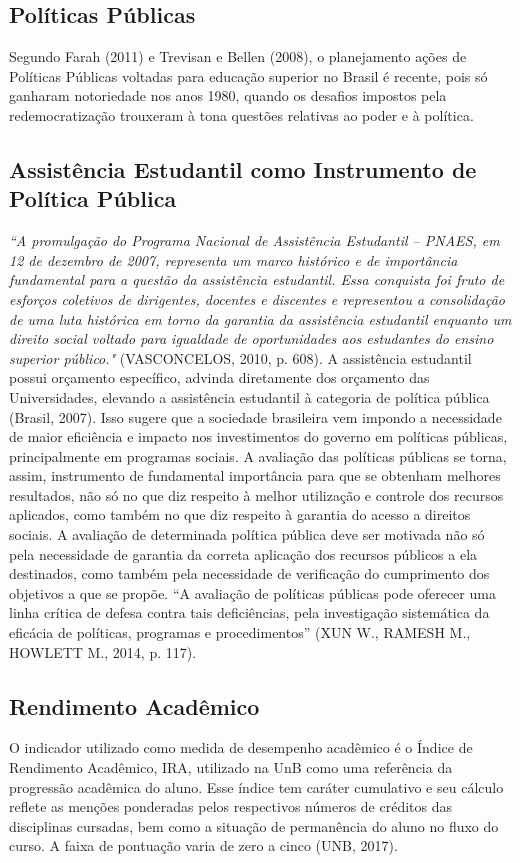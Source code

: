 \subsection{Políticas Públicas}
Segundo Farah (2011) e Trevisan e Bellen (2008), o planejamento ações de Políticas Públicas voltadas para educação superior no Brasil é recente, pois só ganharam notoriedade nos anos 1980, quando os desafios impostos pela redemocratização trouxeram à tona questões relativas ao poder e à política.
\subsection{Assistência Estudantil como Instrumento de Política Pública}
\emph{“A promulgação do Programa Nacional de Assistência Estudantil – PNAES, em 12 de dezembro de 2007, representa um marco histórico e de importância fundamental para a questão da assistência estudantil. Essa conquista foi fruto de esforços coletivos de dirigentes, docentes e discentes e representou a consolidação de uma luta histórica em torno da garantia da assistência estudantil enquanto um direito social voltado para igualdade de oportunidades aos estudantes do ensino superior público."} (VASCONCELOS, 2010, p. 608).
A assistência estudantil possui orçamento específico, advinda diretamente dos orçamento das Universidades, elevando a assistência estudantil à categoria de política pública (Brasil, 2007). Isso sugere que a sociedade brasileira vem impondo a necessidade de maior eficiência e impacto nos investimentos do governo em políticas públicas, principalmente em programas sociais. A avaliação das políticas públicas se torna, assim, instrumento de fundamental importância para que se obtenham melhores resultados, não só no que diz respeito à melhor utilização e controle dos recursos aplicados, como também no que diz respeito à garantia do acesso a direitos sociais. A avaliação de determinada política pública deve ser motivada não só pela necessidade de garantia da correta aplicação dos recursos públicos a ela destinados, como também pela necessidade de verificação do cumprimento dos objetivos a que se propõe. “A avaliação de políticas públicas pode oferecer uma linha crítica de defesa contra tais deficiências, pela investigação sistemática da eficácia de políticas, programas e procedimentos” (XUN W., RAMESH M., HOWLETT M., 2014, p. 117).
\subsection{Rendimento Acadêmico}
O indicador utilizado como medida de desempenho acadêmico é o Índice de Rendimento Acadêmico, IRA, utilizado na UnB como uma referência da progressão acadêmica do aluno. Esse índice tem caráter cumulativo e seu cálculo reflete as menções ponderadas pelos respectivos números de créditos das disciplinas cursadas, bem como a situação de permanência do aluno no fluxo do curso. A faixa de pontuação varia de zero a cinco (UNB, 2017).
